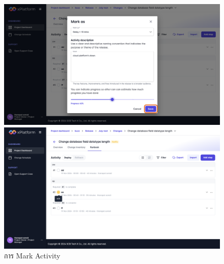 \begin{figure}[H]
\begin{center}
    \includegraphics[width=\linewidth]{resources/pages/change-runbook/mark-activity/15.png}

    \vspace{1in}

    \includegraphics[width=\linewidth]{resources/pages/change-runbook/mark-activity/16.png}
\end{center}
\caption[การ Mark Activity]{การ Mark Activity}
\label{fig:mark-activity}
\end{figure}

\newpage
